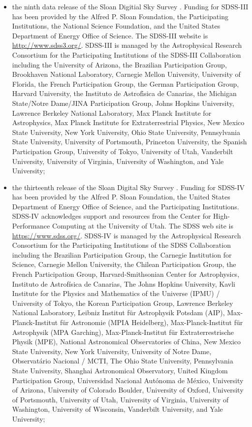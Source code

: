 \documentclass[longauth]{aa}
\begin{document}
\begin{appendix}
\begin{itemize}
\item the ninth data release of the Sloan Digitial Sky Survey \citep[SDSS DR9,][]{SDSS9}. Funding for SDSS-III has been provided by the Alfred P. Sloan Foundation, the Participating Institutions, the National Science Foundation, and the United States Department of Energy Office of Science. The SDSS-III website is \url{http://www.sdss3.org/}. SDSS-III is managed by the Astrophysical Research Consortium for the Participating Institutions of the SDSS-III Collaboration including the University of Arizona, the Brazilian Participation Group, Brookhaven National Laboratory, Carnegie Mellon University, University of Florida, the French Participation Group, the German Participation Group, Harvard University, the Instituto de Astrof\'{\i}sica de Canarias, the Michigan State/Notre Dame/JINA Participation Group, Johns Hopkins University, Lawrence Berkeley National Laboratory, Max Planck Institute for Astrophysics, Max Planck Institute for Extraterrestrial Physics, New Mexico State University, New York University, Ohio State University, Pennsylvania State University, University of Portsmouth, Princeton University, the Spanish Participation Group, University of Tokyo, University of Utah, Vanderbilt University, University of Virginia, University of Washington, and Yale University;
\item the thirteenth release of the Sloan Digital Sky Survey \citep[SDSS DR13,][]{2017ApJS..233...25A}. Funding for SDSS-IV has been provided by the Alfred P. Sloan Foundation, the United States Department of Energy Office of Science, and the Participating Institutions. SDSS-IV acknowledges support and resources from the Center for High-Performance Computing at the University of Utah. The SDSS web site is \url{https://www.sdss.org/}. SDSS-IV is managed by the Astrophysical Research Consortium for the Participating Institutions of the SDSS Collaboration including the Brazilian Participation Group, the Carnegie Institution for Science, Carnegie Mellon University, the Chilean Participation Group, the French Participation Group, Harvard-Smithsonian Center for Astrophysics, Instituto de Astrof\'isica de Canarias, The Johns Hopkins University, Kavli Institute for the Physics and Mathematics of the Universe (IPMU) / University of Tokyo, the Korean Participation Group, Lawrence Berkeley National Laboratory, Leibniz Institut f\"ur Astrophysik Potsdam (AIP),  Max-Planck-Institut f\"ur Astronomie (MPIA Heidelberg), Max-Planck-Institut f\"ur Astrophysik (MPA Garching), Max-Planck-Institut f\"ur Extraterrestrische Physik (MPE), National Astronomical Observatories of China, New Mexico State University, New York University, University of Notre Dame, Observat\'ario Nacional / MCTI, The Ohio State University, Pennsylvania State University, Shanghai Astronomical Observatory, United Kingdom Participation Group, Universidad Nacional Aut\'onoma de M\'{e}xico, University of Arizona, University of Colorado Boulder, University of Oxford, University of Portsmouth, University of Utah, University of Virginia, University of Washington, University of Wisconsin, Vanderbilt University, and Yale University;

\end{itemize}
\end{appendix}
\end{document}
